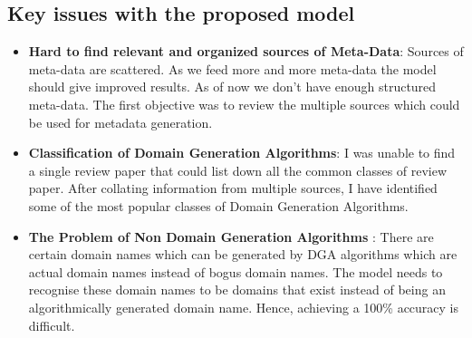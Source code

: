 \documentclass[conference]{IEEEtran}
\begin{document}
\subsection{Key issues with the proposed model}
\begin{itemize}
\item \textbf{Hard to find relevant and organized sources of Meta-Data}: Sources of meta-data are scattered. As we feed more and more meta-data the model should give improved results. As of now we don’t have enough structured meta-data. The first objective was to review the multiple sources which could be used for metadata generation.
\item \textbf{Classification of Domain Generation Algorithms}: I was unable to find a single review paper that could list down all the common classes of review paper. After collating information from multiple sources, I have identified some of the most popular classes of Domain Generation Algorithms.
\item \textbf{The Problem of Non Domain Generation Algorithms} :  There are certain domain names which can be generated by DGA algorithms which are actual domain names instead of bogus domain names. The model needs to recognise these domain names to be domains that exist instead of being an algorithmically generated domain name. Hence, achieving a 100\% accuracy is difficult.
\end{itemize}
\end{document}

